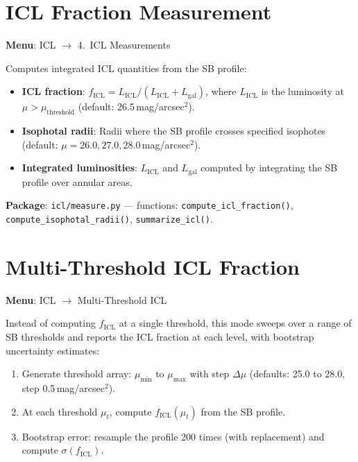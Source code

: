 \documentclass[11pt,fleqn]{book}
\begin{document}
\section{ICL Fraction Measurement}
\label{sec:icl-measure}

\textbf{Menu}: ICL $\to$ 4.\ ICL Measurements

Computes integrated ICL quantities from the SB profile:

\begin{itemize}[leftmargin=2em]
  \item \textbf{ICL fraction}: $f_\mathrm{ICL} = L_\mathrm{ICL} / (L_\mathrm{ICL} + L_\mathrm{gal})$, where $L_\mathrm{ICL}$ is the luminosity at $\mu > \mu_\mathrm{threshold}$ (default: 26.5\,mag/arcsec$^2$).
  \item \textbf{Isophotal radii}: Radii where the SB profile crosses specified isophotes (default: $\mu = 26.0, 27.0, 28.0$\,mag/arcsec$^2$).
  \item \textbf{Integrated luminosities}: $L_\mathrm{ICL}$ and $L_\mathrm{gal}$ computed by integrating the SB profile over annular areas.
\end{itemize}

\textbf{Package}: \texttt{icl/measure.py} --- functions: \texttt{compute\_icl\_fraction()}, \texttt{compute\_isophotal\_radii()}, \texttt{summarize\_icl()}.


\section{Multi-Threshold ICL Fraction}
\label{sec:icl-multi}

\textbf{Menu}: ICL $\to$ Multi-Threshold ICL

Instead of computing $f_\mathrm{ICL}$ at a single threshold, this mode sweeps over a range of SB thresholds and reports the ICL fraction at each level, with bootstrap uncertainty estimates:

\begin{enumerate}[leftmargin=2em]
  \item Generate threshold array: $\mu_\mathrm{min}$ to $\mu_\mathrm{max}$ with step $\Delta\mu$ (defaults: 25.0 to 28.0, step 0.5\,mag/arcsec$^2$).
  \item At each threshold $\mu_t$, compute $f_\mathrm{ICL}(\mu_t)$ from the SB profile.
  \item Bootstrap error: resample the profile 200 times (with replacement) and compute $\sigma(f_\mathrm{ICL})$.
\end{enumerate}
\end{document}
